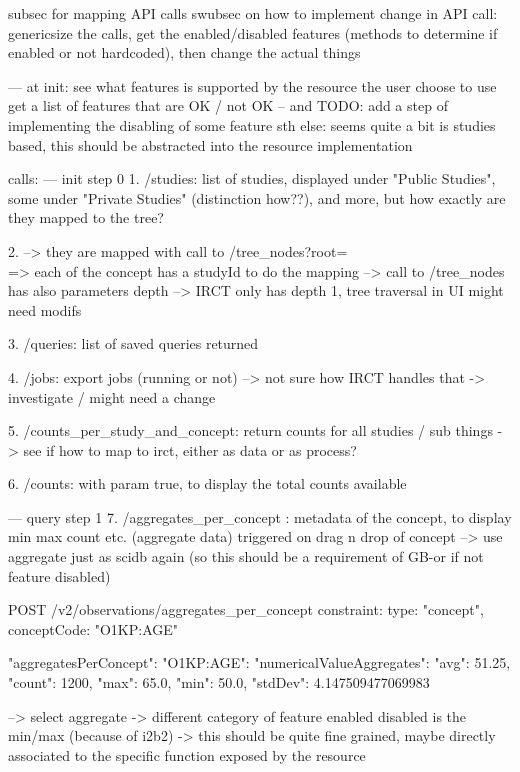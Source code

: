 subsec for mapping API calls
swubsec on how to implement change in API call: genericsize the calls, get the enabled/disabled features (methods to determine if enabled or not hardcoded), then change the actual things

---
at init: see what features is supported by the resource the user choose to use
get a list of features that are OK / not OK -- and TODO: add a step of implementing the disabling of some feature
sth else: seems quite a bit is studies based, this should be abstracted into the resource implementation

calls:
--- init step 0
1. /studies: list of studies, displayed under "Public Studies", some under "Private Studies" (distinction how??), and more, but how exactly are they mapped to the tree?

2. --> they are mapped with call to /tree\_nodes?root=\\ => each of the concept has a studyId to do the mapping
--> call to /tree\_nodes has also parameters depth --> IRCT only has depth 1, tree traversal in UI might need modifs

3. /queries: list of saved queries returned

4. /jobs: export jobs (running or not) --> not sure how IRCT handles that -> investigate / might need a change

5. /counts\_per\_study\_and\_concept: return counts for all studies / sub things -> see if how to map to irct, either as data or as process?

6. /counts: with param true, to display the total counts available

--- query step 1
7. /aggregates\_per\_concept : metadata of the concept, to display min max count etc. (aggregate data)
triggered on drag n drop of concept
--> use aggregate just as scidb again (so this should be a requirement of GB-or if not feature disabled)

POST /v2/observations/aggregates\_per\_concept
{constraint: {type: "concept", conceptCode: "O1KP:AGE"}}

{
  "aggregatesPerConcept": {
    "O1KP:AGE": {
      "numericalValueAggregates": {
        "avg": 51.25,
        "count": 1200,
        "max": 65.0,
        "min": 50.0,
        "stdDev": 4.147509477069983
      }
    }
  }
}

--> select aggregate
-> different category of feature enabled disabled is the min/max (because of i2b2) -> this should be quite fine grained, maybe directly associated to the specific function exposed by the resource


